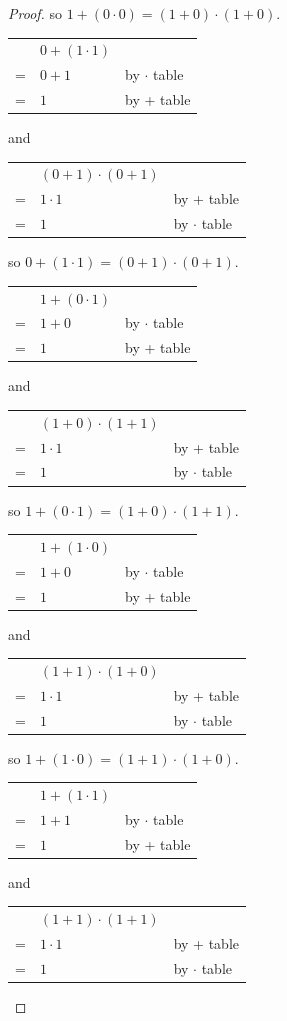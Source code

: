 \documentclass[14pt]{extarticle}
\newcommand{\cy}{\color{cyan}}
\begin{document}
\begin{proof}
so \(1 + (0 \cdot 0) = (1 + 0) \cdot (1 + 0)\).

\begin{tabular}{cll}
  & \(0 + (1 \cdot 1)\) & \\
= & \(0 + 1\) & {\cy by $\cdot$ table} \\
= & \(1\) & {\cy by + table}
\end{tabular}
and
\begin{tabular}{cll}
  & \((0 + 1) \cdot (0 + 1)\) & \\
= & \(1 \cdot 1\) & {\cy by + table} \\
= & \(1\) & {\cy by $\cdot$ table}
\end{tabular}

so \(0 + (1 \cdot 1) = (0 + 1) \cdot (0 + 1)\).

\begin{tabular}{cll}
  & \(1 + (0 \cdot 1)\) & \\
= & \(1 + 0\) & {\cy by $\cdot$ table} \\
= & \(1\) & {\cy by + table}
\end{tabular}
and
\begin{tabular}{cll}
  & \((1 + 0) \cdot (1 + 1)\) & \\
= & \(1 \cdot 1\) & {\cy by + table} \\
= & \(1\) & {\cy by $\cdot$ table}
\end{tabular}

so \(1 + (0 \cdot 1) = (1 + 0) \cdot (1 + 1)\).

\begin{tabular}{cll}
  & \(1 + (1 \cdot 0)\) & \\
= & \(1 + 0\) & {\cy by $\cdot$ table} \\
= & \(1\) & {\cy by + table}
\end{tabular}
and
\begin{tabular}{cll}
  & \((1 + 1) \cdot (1 + 0)\) & \\
= & \(1 \cdot 1\) & {\cy by + table} \\
= & \(1\) & {\cy by $\cdot$ table}
\end{tabular}

so \(1 + (1 \cdot 0) = (1 + 1) \cdot (1 + 0)\).

\begin{tabular}{cll}
  & \(1 + (1 \cdot 1)\) & \\
= & \(1 + 1\) & {\cy by $\cdot$ table} \\
= & \(1\) & {\cy by + table}
\end{tabular}
and
\begin{tabular}{cll}
  & \((1 + 1) \cdot (1 + 1)\) & \\
= & \(1 \cdot 1\) & {\cy by + table} \\
= & \(1\) & {\cy by $\cdot$ table}
\end{tabular}


\end{proof}
\end{document}
